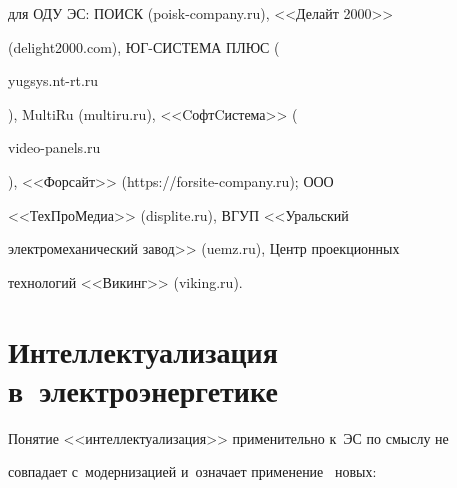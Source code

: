 для ОДУ ЭС: ПОИСК ({\small{\sf poisk-company.ru}}), <<Делайт 2000>> 


({\small{\sf delight2000.com}}), ЮГ-СИСТЕМА ПЛЮС ({\small{\sf  


yugsys.nt-rt.ru}}), MultiRu (multiru.ru), <<CофтCистема>> ({\small{\sf  


video-panels.ru}}), <<Форсайт>> ({\small{\sf https://forsite-company.ru}}); ООО 


<<ТехПроМедиа>> ({\small{\sf displite.ru}}), ВГУП <<Уральский 


электромеханический завод>> ({\small{\sf uemz.ru}}), Центр проекционных 


технологий <<Викинг>> ({\small{\sf viking.ru}}).





\vspace*{-3pt}


  


\section{Интеллектуализация в~электроэнергетике}





\vspace*{-3pt}


  


  Понятие <<интеллектуализация>> применительно к~ЭС по смыслу не 


совпадает с~модернизацией и~означает применение~\cite{7-kol} новых:\\[-12pt] 


